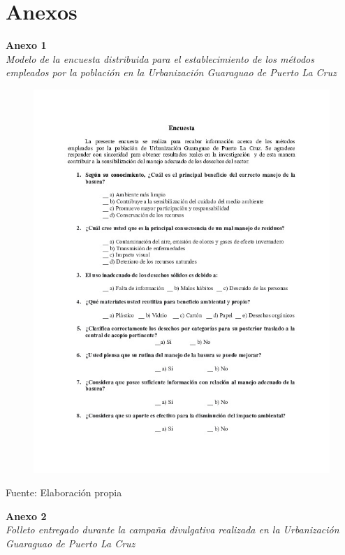 \newpage

{\setlength{\parskip}{0cm} {
\chapter*{Anexos}

\setlength{\parindent}{0ex}

\textbf{Anexo 1} \\
\textit{Modelo de la encuesta distribuida para el establecimiento de los métodos empleados por la población en la Urbanización Guaraguao de Puerto La Cruz}
}

\begin{figure}[!ht]
    \centering
    \includegraphics[width=13cm]{Media/Encuesta 1.jpg}
    \label{fig:encuesta}
\end{figure}

\setlength{\parindent}{0ex}

Fuente: Elaboración propia

\newpage

\setlength{\parindent}{0ex}

\textbf{Anexo 2} \\
\textit{Folleto entregado durante la campaña divulgativa realizada en la Urbanización Guaraguao de Puerto La Cruz}
}
